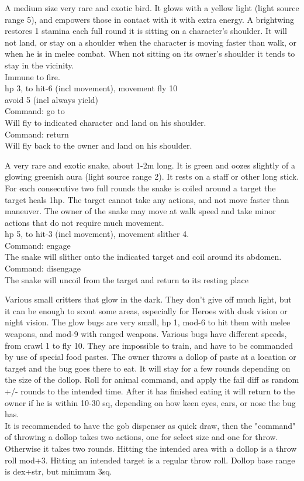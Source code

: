 A medium size very rare and exotic bird. It glows with a yellow light (light source range 5), and empowers those in contact with it with extra energy. A brightwing restores 1 stamina each full round it is sitting on a character's shoulder. It will not land, or stay on a shoulder when the character is moving faster than walk, or when he is in melee combat. When not sitting on its owner's shoulder it tends to stay in the vicinity. \\
Immune to fire. \\
hp 3, to hit-6 (incl movement), movement fly 10 \\
avoid 5 (incl always yield) \\
Command: go to \\
Will fly to indicated character and land on his shoulder. \\
Command: return \\
Will fly back to the owner and land on his shoulder.


A very rare and exotic snake, about 1-2m long. It is green and oozes slightly of a glowing greenish aura (light source range 2). It rests on a staff or other long stick. For each consecutive two full rounds the snake is coiled around a target the target heals 1hp. The target cannot take any actions, and not move faster than maneuver. The owner of the snake may move at walk speed and take minor actions that do not require much movement. \\
hp 5, to hit-3 (incl movement), movement slither 4. \\
Command: engage \\
The snake will slither onto the indicated target and coil around its abdomen.
Command: disengage \\
The snake will uncoil from the target and return to its resting place


Various small critters that glow in the dark. They don't give off much light, but it can be enough to scout some areas, especially for Heroes with dusk vision or night vision. The glow bugs are very small, hp 1, mod-6 to hit them with melee weapons, and mod-9 with ranged weapons. Various bugs have different speeds, from crawl 1 to fly 10. They are impossible to train, and have to be commanded by use of special food pastes. The owner throws a dollop of paste at a location or target and the bug goes there to eat. It will stay for a few rounds depending on the size of the dollop. Roll for animal command, and apply the fail diff as random +/- rounds to the intended time. After it has finished eating it will return to the owner if he is within 10-30 sq, depending on how keen eyes, ears, or nose the bug has. \\
It is recommended to have the gob dispenser as quick draw, then the "command" of throwing a dollop takes two actions, one for select size and one for throw. Otherwise it takes two rounds. Hitting the intended area with a dollop is a throw roll mod+3. Hitting an intended target is a regular throw roll. Dollop base range is dex+str, but minimum 3sq.


